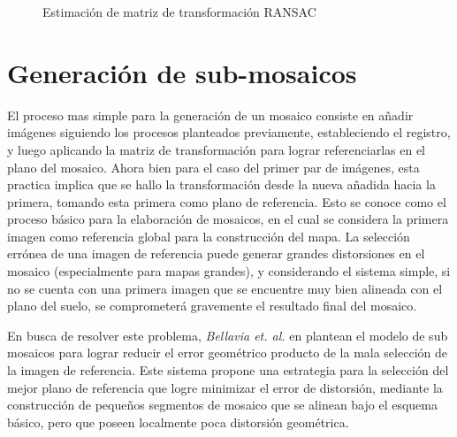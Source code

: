 \begin{figure}[hb]
	\centering
	\begin{minipage}{\linewidth}
		\begin{algorithm}[H] %
			\caption{Estimación de matriz de transformación RANSAC}
			\label{ransac}
			\SetAlgoLined
		\end{algorithm}
	\end{minipage}
\end{figure}



\section{Generación de sub-mosaicos}

El proceso mas simple para la generación de un mosaico consiste en añadir imágenes siguiendo los procesos planteados previamente, estableciendo el registro, y luego aplicando la matriz de transformación para lograr referenciarlas en el plano del mosaico. Ahora bien para el caso del primer par de imágenes, esta practica implica que se hallo la transformación desde la nueva añadida hacia la primera, tomando esta primera como plano de referencia. Esto se conoce como el proceso básico para la elaboración de mosaicos, en el cual se considera la primera imagen como referencia global para la construcción del mapa. La selección errónea de una imagen de referencia puede generar grandes distorsiones en el mosaico (especialmente para mapas grandes), y considerando el sistema simple, si no se cuenta con una primera imagen que se encuentre muy bien alineada con el plano del suelo, se comprometerá gravemente el resultado final del mosaico.

En busca de resolver este problema, \textit{Bellavia et. al.} en \cite{bellavia-ref,bellavia-ransac} plantean el modelo de sub mosaicos para lograr reducir el error geométrico producto de la mala selección de la imagen de referencia. Este sistema propone una estrategia para la selección del mejor plano de referencia que logre minimizar el error de distorsión, mediante la construcción de pequeños segmentos de mosaico que se alinean bajo el esquema básico, pero que poseen localmente poca distorsión geométrica.

